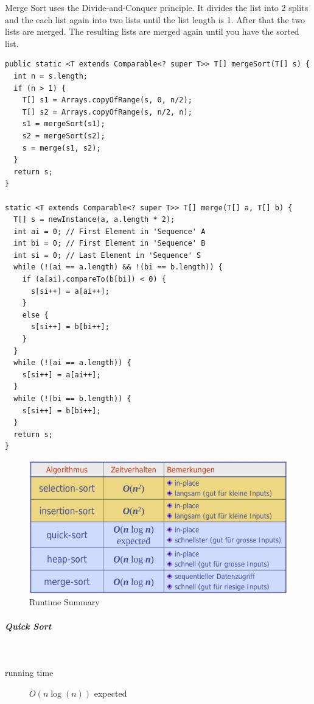 \documentclass[11pt,twoside,twocolumn,landscape]{article}
\begin{document}
Merge Sort uses the Divide-and-Conquer principle.
It divides the list into 2 splits and the each list again into two lists until the list length is 1.
After that the two lists are merged.
The resulting lists are merged again until you have the sorted list.
\lstset{language=java,label= ,caption= ,captionpos=b,numbers=none}
\begin{lstlisting}
public static <T extends Comparable<? super T>> T[] mergeSort(T[] s) {  
  int n = s.length;
  if (n > 1) {
    T[] s1 = Arrays.copyOfRange(s, 0, n/2);
    T[] s2 = Arrays.copyOfRange(s, n/2, n);
    s1 = mergeSort(s1);
    s2 = mergeSort(s2);
    s = merge(s1, s2);
  }
  return s;
}

static <T extends Comparable<? super T>> T[] merge(T[] a, T[] b) {
  T[] s = newInstance(a, a.length * 2);
  int ai = 0; // First Element in 'Sequence' A
  int bi = 0; // First Element in 'Sequence' B
  int si = 0; // Last Element in 'Sequence' S
  while (!(ai == a.length) && !(bi == b.length)) {
    if (a[ai].compareTo(b[bi]) < 0) {
      s[si++] = a[ai++];
    }
    else {
      s[si++] = b[bi++];
    }
  }
  while (!(ai == a.length)) {
    s[si++] = a[ai++];
  }
  while (!(bi == b.length)) {
    s[si++] = b[bi++];
  }
  return s;
}
\end{lstlisting}

\begin{figure}[htbp]
\centering
\includegraphics[width=.9\linewidth]{img/sort_algorithm_summary_runtime.png}
\caption{\label{fig:org4250f3e}Runtime Summary}
\end{figure}

\subparagraph{Quick Sort} \
\label{sec:org76821a9}

\begin{description}
\item[{running time}] \(O(n \log(n))\) expected
\end{description}
\end{document}
